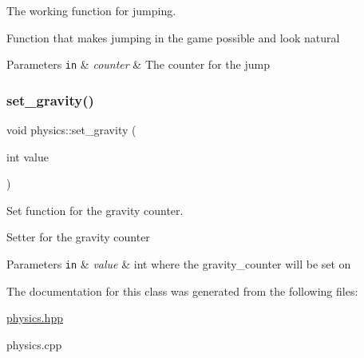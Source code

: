 The working function for jumping. 

Function that makes jumping in the game possible and look natural


\begin{DoxyParams}[1]{Parameters}
\mbox{\tt in}  & {\em counter} & The counter for the jump \\
\hline
\end{DoxyParams}
\mbox{\label{classphysics_a8b0dff646c304dee3cb5c095d821dc87}} 
\subsubsection{\texorpdfstring{set\+\_\+gravity()}{set\_gravity()}}
{\footnotesize\ttfamily void physics\+::set\+\_\+gravity (\begin{DoxyParamCaption}\item[{int}]{value }\end{DoxyParamCaption})}



Set function for the gravity counter. 

Setter for the gravity counter 
\begin{DoxyParams}[1]{Parameters}
\mbox{\tt in}  & {\em value} & int where the gravity\+\_\+counter will be set on \\
\hline
\end{DoxyParams}


The documentation for this class was generated from the following files\+:\begin{DoxyCompactItemize}
\item 
\hyperlink{physics_8hpp}{physics.\+hpp}\item 
physics.\+cpp\end{DoxyCompactItemize}
